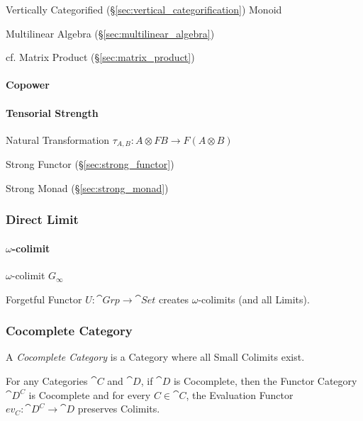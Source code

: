 Vertically Categorified (\S\ref{sec:vertical_categorification}) Monoid

Multilinear Algebra (\S\ref{sec:multilinear_algebra})

cf. Matrix Product (\S\ref{sec:matrix_product})



\paragraph{Copower}\label{sec:copower}\hfill

\paragraph{Tensorial Strength}\label{sec:tensorial_strength}\hfill

Natural Transformation $\tau_{A,B} : A \otimes F B \rightarrow F (A
\otimes B)$

Strong Functor (\S\ref{sec:strong_functor})

Strong Monad (\S\ref{sec:strong_monad})



\subsubsection{Direct Limit}\label{sec:direct_limit}

\paragraph{$\omega$-colimit}\label{sec:omega_colimit}\hfill

$\omega$-colimit $G_\infty$

Forgetful Functor $U : \cat{Grp} \rightarrow \cat{Set}$ creates
$\omega$-colimits (and all Limits). \cite{awodey06}



\subsubsection{Cocomplete Category}\label{sec:cocomplete_category}

A \emph{Cocomplete Category} is a Category where all Small Colimits
exist.

For any Categories $\cat{C}$ and $\cat{D}$, if $\cat{D}$ is
Cocomplete, then the Functor Category $\cat{D^C}$ is Cocomplete and
for every $C \in \cat{C}$, the Evaluation Functor $ev_C :
\cat{D^C} \rightarrow \cat{D}$ preserves Colimits.

